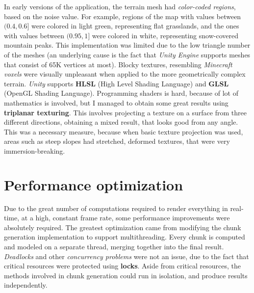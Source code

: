 In early versions of the application, the terrain mesh had \textit{color-coded regions}, based on the noise value. For example, regions of the map with values between \((0.4, 0.6]\)
were colored in light green, representing flat grasslands, and the ones with values between \((0.95, 1]\) were colored in white, representing snow-covered mountain peaks. This implementation was limited due to the low triangle number of the meshes (an underlying cause is the fact that \textit{Unity Engine} supports meshes that consist of 65K vertices at most). Blocky textures, resembling \textit{Minecraft voxels} were visually unpleasant when applied to the more geometrically complex terrain. \textit{Unity} supports \textbf{HLSL}\cite{hlsl} (High Level Shading Language) and \textbf{GLSL}\cite{glsl} (OpenGL Shading Language). Programming shaders is hard, because of lot of mathematics is involved, but I managed to obtain some great results using \textbf{triplanar texturing}. This involves projecting a texture on a surface from three different directions, obtaining a mixed result, that looks good from any angle. This was a necessary measure, because when basic texture projection was used, areas such as steep slopes had stretched, deformed textures, that were very immersion-breaking.

\section{Performance optimization}

Due to the great number of computations required to render everything in real-time, at a high, constant frame rate, some performance improvements were absolutely required. The greatest optimization came from modifying the chunk generation implementation to support multithreading. Every chunk is computed and modeled on a separate thread, merging together into the final result. \textit{Deadlocks} and other \textit{concurrency problems} were not an issue, due to the fact that critical resources were protected using \textbf{locks}. Aside from critical resources, the methods involved in chunk generation could run in isolation, and produce results independently.\\

